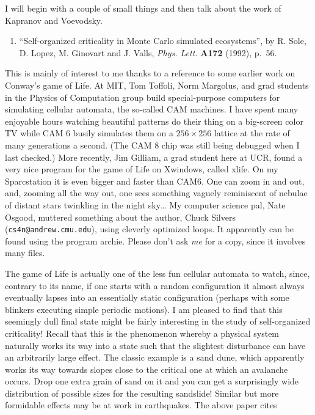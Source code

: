 \documentclass{article}
\def\tightlist{}
\begin{document}
I will begin with a couple of small things and then talk about the work
of Kapranov and Voevodsky.

\begin{enumerate}
\def\labelenumi{\arabic{enumi})}
\tightlist
\item
  ``Self-organized criticality in Monte Carlo simulated ecosystems'', by
  R. Sole, D. Lopez, M. Ginovart and J. Valls, \emph{Phys. Lett.}
  \textbf{A172} (1992), p.~56.
\end{enumerate}

This is mainly of interest to me thanks to a reference to some earlier
work on Conway's game of Life. At MIT, Tom Toffoli, Norm Margolus, and
grad students in the Physics of Computation group build special-purpose
computers for simulating cellular automata, the so-called CAM machines.
I have spent many enjoyable hours watching beautiful patterns do their
thing on a big-screen color TV while CAM 6 busily simulates them on a
\(256 \times 256\) lattice at the rate of many generations a second.
(The CAM 8 chip was still being debugged when I last checked.) More
recently, Jim Gilliam, a grad student here at UCR, found a very nice
program for the game of Life on Xwindows, called xlife. On my
Sparcstation it is even bigger and faster than CAM6. One can zoom in and
out, and, zooming all the way out, one sees something vaguely
reminiscent of nebulae of distant stars twinkling in the night
sky\ldots{} My computer science pal, Nate Osgood, muttered something
about the author, Chuck Silvers (\texttt{cs4n@andrew.cmu.edu}), using
cleverly optimized loops. It apparently can be found using the program
archie. Please don't ask \emph{me} for a copy, since it involves many
files.

The game of Life is actually one of the less fun cellular automata to
watch, since, contrary to its name, if one starts with a random
configuration it almost always eventually lapses into an essentially
static configuration (perhaps with some blinkers executing simple
periodic motions). I am pleased to find that this seemingly dull final
state might be fairly interesting in the study of self-organized
criticality! Recall that this is the phenomenon whereby a physical
system naturally works its way into a state such that the slightest
disturbance can have an arbitrarily large effect. The classic example is
a sand dune, which apparently works its way towards slopes close to the
critical one at which an avalanche occurs. Drop one extra grain of sand
on it and you can get a surprisingly wide distribution of possible sizes
for the resulting sandslide! Similar but more formidable effects may be
at work in earthquakes. The above paper cites
\end{document}
